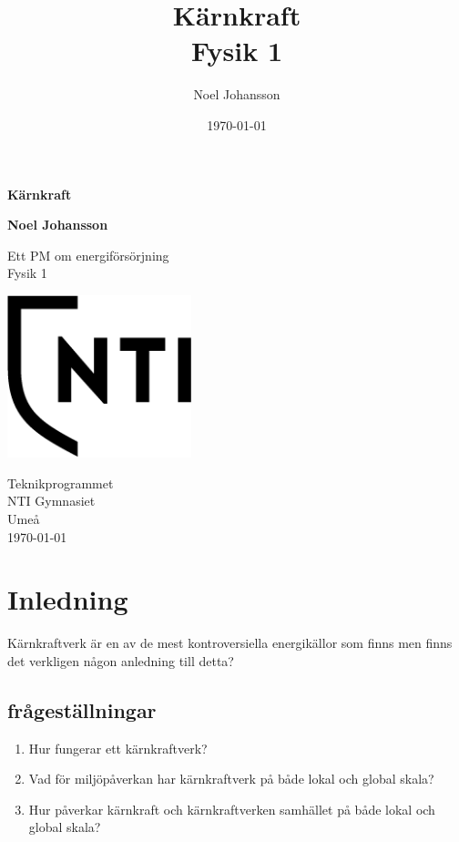 \documentclass[11p]{article}
\title{Kärnkraft \\ \small Fysik 1}
\author{Noel Johansson }
\date{\today}
\begin{document}
    \begin{titlepage}
        \begin{center}
            \vspace*{1cm}

            \Huge
            \textbf{Kärnkraft}

            \vspace{0.5cm}
            \LARGE


            \vspace{1.5cm}

            \textbf{Noel Johansson}

            \vfill

            Ett PM om energiförsörjning \\
            Fysik 1

            \vspace{0.8cm}

            \includegraphics[width=0.4\textwidth]{../images/NTI Gymnasiet_Symbol_print_svart.png}

            \Large
            Teknikprogrammet\\
            NTI Gymnasiet\\
            Umeå\\
            \today

        \end{center}
    \end{titlepage}
    \tableofcontents
    \newpage



    \section{Inledning}
    Kärnkraftverk är en av de mest kontroversiella energikällor som finns men finns det verkligen någon anledning till detta?
    \subsection{frågeställningar}
    \begin{enumerate}
        \item Hur fungerar ett kärnkraftverk?
        \item Vad för miljöpåverkan har kärnkraftverk på både lokal och global skala?
        \item Hur påverkar kärnkraft och kärnkraftverken samhället på både lokal och global skala?
    \end{enumerate}
\end{document}
